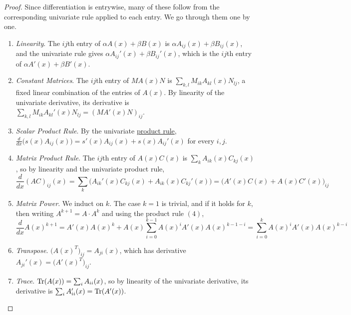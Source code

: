 	\begin{proof}
	  Since differentiation is entrywise, many of these follow from the corresponding univariate rule applied to each entry. We go through them one by one.
		\begin{enumerate}
			\item \textit{Linearity}. The $ij$th entry of $\alpha A(x) + \beta B(x)$ is $\alpha A_{ij}(x) + \beta B_{ij}(x)$, and the univariate rule gives $\alpha A_{ij}'(x) + \beta B_{ij}'(x)$, which is the $ij$th entry of $\alpha A'(x) + \beta B'(x)$.

			\item \textit{Constant Matrices}. The $ij$th entry of $M A(x) N$ is $\sum_{k, l} M_{ik} A_{kl}(x) N_{lj}$, a fixed linear combination of the entries of $A(x)$. By linearity of the univariate derivative, its derivative is $\sum_{k, l} M_{ik} A_{kl}'(x) N_{lj} = (M A'(x) N)_{ij}$.

			\item \textit{Scalar Product Rule}. By the univariate \hyperref[real-thm:product_rule]{product rule}, $\frac{d}{dx} \big( s(x) A_{ij}(x) \big) = s'(x) A_{ij}(x) + s(x) A_{ij}'(x)$ for every $i, j$.

			\item \textit{Matrix Product Rule}. The $ij$th entry of $A(x)C(x)$ is $\sum_k A_{ik}(x) C_{kj}(x)$, so by linearity and the univariate product rule,
				\begin{equation}
					\frac{d}{dx} (AC)_{ij}(x) = \sum_{k} \bigg( A_{ik}'(x) C_{kj}(x) + A_{ik}(x) C_{kj}'(x) \bigg) = \bigg( A'(x) C(x) + A(x) C'(x) \bigg)_{ij}
				\end{equation}

			\item \textit{Matrix Power}. We induct on $k$. The case $k = 1$ is trivial, and if it holds for $k$, then writing $A^{k+1} = A \cdot A^k$ and using the product rule $(4)$,
				\begin{equation}
					\frac{d}{dx} A(x)^{k+1} = A'(x) A(x)^{k} + A(x) \sum_{i=0}^{k-1} A(x)^i A'(x) A(x)^{k-1-i} = \sum_{i=0}^{k} A(x)^i A'(x) A(x)^{k-i}
				\end{equation}

			\item \textit{Transpose}. $\big(A(x)^T\big)_{ij} = A_{ji}(x)$, which has derivative $A_{ji}'(x) = \big(A'(x)^T\big)_{ij}$.

			\item \textit{Trace}. $\operatorname{Tr}(A(x)) = \sum_i A_{ii}(x)$, so by linearity of the univariate derivative, its derivative is $\sum_i A_{ii}'(x) = \operatorname{Tr}(A'(x))$.


\end{enumerate}
\end{proof}
